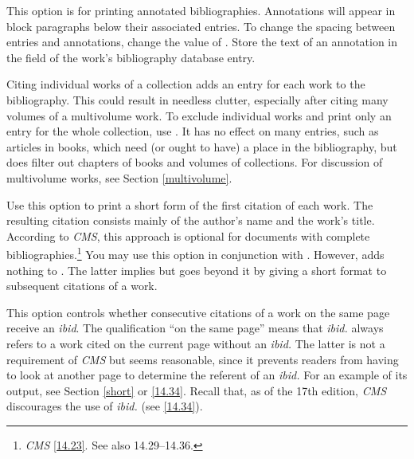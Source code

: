 \documentclass[11pt,letterpaper,oneside]{article}
\begin{document}
\begin{optionlist}


\noindent This option is for printing annotated bibliographies.
Annotations will appear in block paragraphs below their associated
entries. To change the spacing between entries and annotations, change
the value of . Store the text of an annotation in the
 field of the work's bibliography database entry.


\noindent Citing individual works of a collection adds an entry for
each work to the bibliography. This could result in needless clutter,
especially after citing many volumes of a multivolume work. To exclude
individual works and print only an entry for the whole collection, use
. It has no effect on many 
entries, such as articles in books, which need (or ought to have) a
place in the bibliography, but does filter out chapters of books and
volumes of collections. For discussion of multivolume works, see
Section \ref{multivolume}.


\noindent Use this option to print a short form of the first citation
of each work. The resulting citation consists mainly of the author's
name and the work's title. According to \textit{CMS}, this approach is
optional for documents with complete
bibliographies.\footnote{\textit{CMS} \ref{14.23}. See also
14.29--14.36.} You may use this option in conjunction with .
However,  adds nothing to . The latter
implies  but goes beyond it by giving a short format
to subsequent citations of a work.


\noindent This option controls whether consecutive citations of a work
on the same page receive an \textit{ibid}. The qualification ``on the
same page'' means that \textit{ibid.} always refers to a work cited on
the current page without an \textit{ibid.} The latter is not a
requirement of \textit{CMS} but seems reasonable, since it prevents
readers from having to look at another page to determine the referent
of an \textit{ibid.} For an example of its output, see Section
\ref{short} or \ref{14.34}. Recall that, as of the 17th edition,
\textit{CMS} discourages the use of \textit{ibid.} (see \ref{14.34}).


\end{optionlist}
\end{document}
